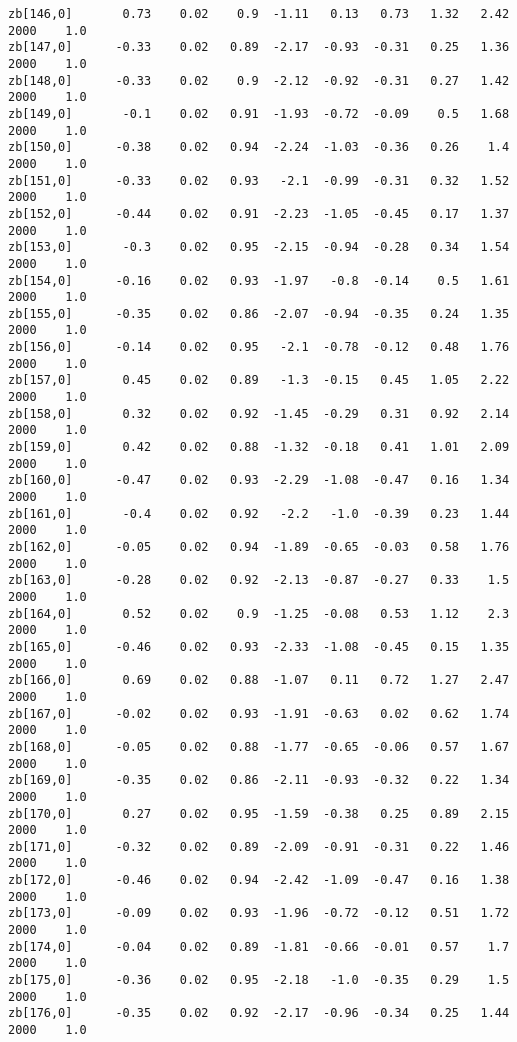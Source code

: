 \documentclass[11pt]{article}
\begin{document}
\begin{Verbatim}[commandchars=\\\{\}]
zb[146,0]       0.73    0.02    0.9  -1.11   0.13   0.73   1.32   2.42   2000    1.0
zb[147,0]      -0.33    0.02   0.89  -2.17  -0.93  -0.31   0.25   1.36   2000    1.0
zb[148,0]      -0.33    0.02    0.9  -2.12  -0.92  -0.31   0.27   1.42   2000    1.0
zb[149,0]       -0.1    0.02   0.91  -1.93  -0.72  -0.09    0.5   1.68   2000    1.0
zb[150,0]      -0.38    0.02   0.94  -2.24  -1.03  -0.36   0.26    1.4   2000    1.0
zb[151,0]      -0.33    0.02   0.93   -2.1  -0.99  -0.31   0.32   1.52   2000    1.0
zb[152,0]      -0.44    0.02   0.91  -2.23  -1.05  -0.45   0.17   1.37   2000    1.0
zb[153,0]       -0.3    0.02   0.95  -2.15  -0.94  -0.28   0.34   1.54   2000    1.0
zb[154,0]      -0.16    0.02   0.93  -1.97   -0.8  -0.14    0.5   1.61   2000    1.0
zb[155,0]      -0.35    0.02   0.86  -2.07  -0.94  -0.35   0.24   1.35   2000    1.0
zb[156,0]      -0.14    0.02   0.95   -2.1  -0.78  -0.12   0.48   1.76   2000    1.0
zb[157,0]       0.45    0.02   0.89   -1.3  -0.15   0.45   1.05   2.22   2000    1.0
zb[158,0]       0.32    0.02   0.92  -1.45  -0.29   0.31   0.92   2.14   2000    1.0
zb[159,0]       0.42    0.02   0.88  -1.32  -0.18   0.41   1.01   2.09   2000    1.0
zb[160,0]      -0.47    0.02   0.93  -2.29  -1.08  -0.47   0.16   1.34   2000    1.0
zb[161,0]       -0.4    0.02   0.92   -2.2   -1.0  -0.39   0.23   1.44   2000    1.0
zb[162,0]      -0.05    0.02   0.94  -1.89  -0.65  -0.03   0.58   1.76   2000    1.0
zb[163,0]      -0.28    0.02   0.92  -2.13  -0.87  -0.27   0.33    1.5   2000    1.0
zb[164,0]       0.52    0.02    0.9  -1.25  -0.08   0.53   1.12    2.3   2000    1.0
zb[165,0]      -0.46    0.02   0.93  -2.33  -1.08  -0.45   0.15   1.35   2000    1.0
zb[166,0]       0.69    0.02   0.88  -1.07   0.11   0.72   1.27   2.47   2000    1.0
zb[167,0]      -0.02    0.02   0.93  -1.91  -0.63   0.02   0.62   1.74   2000    1.0
zb[168,0]      -0.05    0.02   0.88  -1.77  -0.65  -0.06   0.57   1.67   2000    1.0
zb[169,0]      -0.35    0.02   0.86  -2.11  -0.93  -0.32   0.22   1.34   2000    1.0
zb[170,0]       0.27    0.02   0.95  -1.59  -0.38   0.25   0.89   2.15   2000    1.0
zb[171,0]      -0.32    0.02   0.89  -2.09  -0.91  -0.31   0.22   1.46   2000    1.0
zb[172,0]      -0.46    0.02   0.94  -2.42  -1.09  -0.47   0.16   1.38   2000    1.0
zb[173,0]      -0.09    0.02   0.93  -1.96  -0.72  -0.12   0.51   1.72   2000    1.0
zb[174,0]      -0.04    0.02   0.89  -1.81  -0.66  -0.01   0.57    1.7   2000    1.0
zb[175,0]      -0.36    0.02   0.95  -2.18   -1.0  -0.35   0.29    1.5   2000    1.0
zb[176,0]      -0.35    0.02   0.92  -2.17  -0.96  -0.34   0.25   1.44   2000    1.0

\end{Verbatim}
\end{document}
